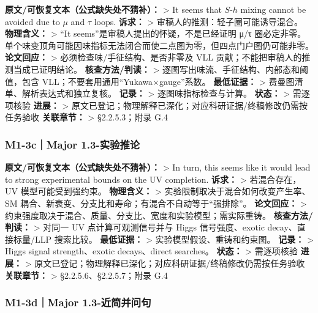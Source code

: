 \documentclass[
]{article}
\begin{document}
\textbf{原文/可恢复文本（公式缺失处不猜补）：} \textgreater{} It seems
that \(S\)-\(h\) mixing cannot be avoided due to \(\mu\) and \(\tau\)
loops. \textbf{诉求：} \textgreater{} 审稿人的推测：轻子圈可能诱导混合。
\textbf{物理含义：} \textgreater{} ``It
seems''是审稿人提出的怀疑，不是已经证明 μ/τ
圈必定非零。单个味变顶角可能因味指标无法闭合而使二点图为零，但四点门户图仍可能非零。
\textbf{论文回应：} \textgreater{} 必须检查味/手征结构、是否非零及 VLL
贡献；不能把审稿人的推测当成已证明结论。 \textbf{核查方法/判读：}
\textgreater{} 逐图写出味流、手征结构、内部态和阈值，包含
VLL；不要套用通用``Yukawa×gauge''系数。 \textbf{最低证据：}
\textgreater{} 费曼图清单、解析表达式和独立复核。 \textbf{记录：}
\textgreater{} 逐图味指标检查与计算。 \textbf{状态：} \textgreater{}
需逐项核验 \textbf{进展：} \textgreater{}
原文已登记；物理解释已深化；对应科研证据/终稿修改仍需按任务验收
\textbf{关联章节：} \textgreater{} §2.2.5.3；附录 G.4

\subsubsection{M1-3c｜Major
1.3-实验推论}\label{m1-3cmajor-1.3-ux5b9eux9a8cux63a8ux8bba}

\textbf{原文/可恢复文本（公式缺失处不猜补）：} \textgreater{} In turn,
this seems like it would lead to strong experimental bounds on the UV
completion. \textbf{诉求：} \textgreater{} 若混合存在，UV
模型可能受到强约束。 \textbf{物理含义：} \textgreater{}
实验限制取决于混合如何改变产生率、SM
耦合、新衰变、分支比和寿命；有混合不自动等于``强排除''。
\textbf{论文回应：} \textgreater{}
约束强度取决于混合、质量、分支比、宽度和实验模型；需实际重铸。
\textbf{核查方法/判读：} \textgreater{} 对同一 UV 点计算可观测信号并与
Higgs 信号强度、exotic decay、直接标量/LLP 搜索比较。
\textbf{最低证据：} \textgreater{} 实验模型假设、重铸和约束图。
\textbf{记录：} \textgreater{} Higgs signal strength、exotic
decays、direct searches。 \textbf{状态：} \textgreater{} 需逐项核验
\textbf{进展：} \textgreater{}
原文已登记；物理解释已深化；对应科研证据/终稿修改仍需按任务验收
\textbf{关联章节：} \textgreater{} §2.2.5.6、§2.2.5.7；附录 G.4

\subsubsection{M1-3d｜Major
1.3-近简并问句}\label{m1-3dmajor-1.3-ux8fd1ux7b80ux5e76ux95eeux53e5}
\end{document}

